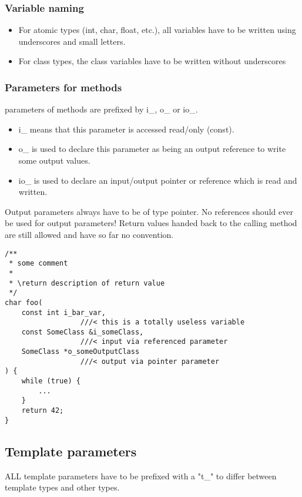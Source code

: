 \documentclass[10pt,a4paper]{article}
\begin{document}
\subsubsection{Variable naming}

\begin{itemize}
	\item For atomic types (int, char, float, etc.), all variables have to be written using underscores and small letters.

	\item For class types, the class variables have to be written without underscores
\end{itemize}

\subsubsection{Parameters for methods}

parameters of methods are prefixed by i\_, o\_ or io\_.
\begin{itemize}
      \item i\_ means that this parameter is accessed read/only (const).
      \item o\_ is used to declare this parameter as being an output reference to write some output values.
      \item io\_ is used to declare an input/output pointer or reference which is read and written.
\end{itemize}
Output parameters always have to be of type pointer.
No references should ever be used for output parameters!
Return values handed back to the calling method are still allowed and have so far no convention.


\begin{lstlisting}
/**
 * some comment
 *
 * \return description of return value 
 */
char foo(
    const int i_bar_var,     
                  ///< this is a totally useless variable
    const SomeClass &i_someClass,    
                  ///< input via referenced parameter
    SomeClass *o_someOutputClass
                  ///< output via pointer parameter
) {
    while (true) {
        ...
    }
    return 42;
}
\end{lstlisting}

\subsection{Template parameters}
ALL template parameters have to be prefixed with a "t\_" to differ between template types and other types.
\end{document}
